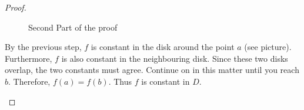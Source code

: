 \documentclass{article}
\begin{document}
\begin{proof}
\begin{itemize}
\begin{figure}[h!]
\caption{Second Part of the proof}
\end{figure}
By the previous step, $f$ is constant in the disk around the point $a$ (see picture). Furthermore, $f$ is also constant in the neighbouring disk. Since these two disks overlap, the two constants must agree. Continue on in this matter until you reach $b$. Therefore, $f(a) = f(b)$. Thus $f$ is constant in $D$.
\end{itemize}
\end{proof}
\end{document}
